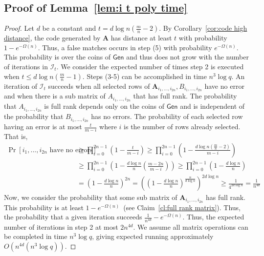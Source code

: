 \documentclass[11pt]{article}
\newcommand{\corref}[1]{\mbox{Corollary~\ref{#1}}}
\newcommand{\lemref}[1]{\mbox{Lemma~\ref{#1}}}
\newcommand{\clref}[1]{\mbox{Claim~\ref{#1}}}
\newcommand{\class}[1]{{\ensuremath{\mathsf{#1}}}}
\newcommand{\gen}{\ensuremath{\class{Gen}}\xspace}
\newcommand{\vect}[1]{\ensuremath{\textbf{#1}}}
\newcommand{\vA}{\vect{A}}
\begin{document}
\subsection{Proof of \lemref{lem:i t poly time}}
\label{sec:proof lem i t poly time}
\begin{proof}
Let $d$ be a constant and $t = d\log n\left( \frac{m}{n}-2\right)$.  
By \corref{cor:code high distance}, the code generated by $\vA$ has distance at least $t$ with probability $1-e^{-\Omega(n)}$.  Thus, a false matches occurs in step (5) with probability $e^{-\Omega(n)}$.  This probability is over the coins of $\gen$ and thus does not grow with the number of iterations in $\mathcal{I}_t$.  We consider the expected number of times step 2 is executed when $t\leq d\log n\left(\frac{m}{n}-1\right)$.  Steps (3-5) can be accomplished in time $n^3\log q $.  An iteration of $\mathcal{I}_t$ succeeds when all selected rows of $\vA_{i_1,..., i_{2n}}, B_{i_1,..., i_{2n}}$ have no error and when there is a sub matrix of $A_{i_1,..., i_{2n}}$ that has full rank.  The probability that $A_{i_1,..., i_{2n}}$ is full rank depends only on the coins of $\gen$ and is independent of the probability that $B_{i_1,...,i_{2n}}$ has no errors.  The probability of each selected row having an error is at most $\frac{t}{m - i}$ where $i$ is the number of rows already selected.  That is,
\begin{align*}
\Pr[i_1,..., i_{2n}\text{ have no errors}]&\geq \prod_{i=0}^{2n-1}\left(1 - \frac{t}{m-i}\right)\geq \prod_{i=0}^{2n-1}\left( 1-\frac{d\log n\left(\frac{m}{n}-2\right)}{m-i}\right)\\
&\geq  \prod_{i=0}^{2n-1}\left( 1-\frac{d\log n}{n}\left(\frac{m-2n}{m-i}\right)\right)\geq \prod_{i=0}^{2n-1}\left( 1-\frac{d\log n}{n}\right) \\
&= \left(1-\frac{d\log n}{n}\right)^{2n}  = \left(\left(1-\frac{d\log n}{n}\right)^{\frac{n}{d\log n}}\right)^{2d\log n}\geq \frac{1}{4^{2d\log n}} = \frac{1}{n^{4d}}
\end{align*}
Now, we consider the probability that some sub matrix of $\vA_{i_1,..., i_{2n}}$ has full rank.  This probability is at least $1-e^{-\Omega(n)}$~(see \clref{cl:full rank matrix}).  Thus, the probability that a given iteration succeeds $\frac{1}{n^{4d}} - e^{-\Omega(n)}$.  
Thus, the expected number of iterations in step 2 at most  $2n^{4d}$.  We assume all matrix operations can be completed in time $n^3\log q$, giving expected running approximately $O(n^{4d}(n^3 \log q))$.  
\end{proof}
\end{document}
